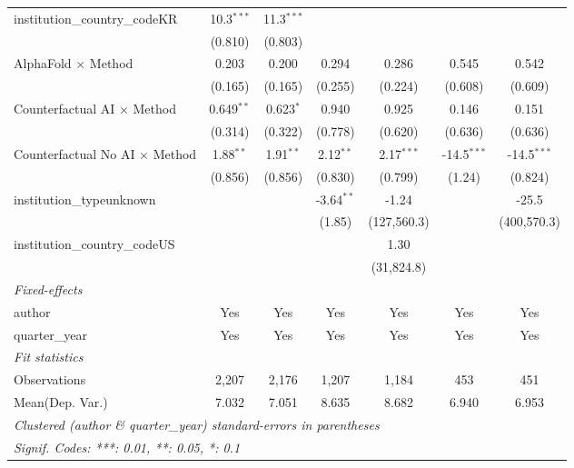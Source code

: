 \begin{tabular}{lcccccc}
   institution\_country\_codeKR          & 10.3$^{***}$   & 11.3$^{***}$   &               &               &               &   \\   
                                         & (0.810)        & (0.803)        &               &               &               &   \\   
   AlphaFold $\times$ Method             & 0.203          & 0.200          & 0.294         & 0.286         & 0.545         & 0.542\\   
                                         & (0.165)        & (0.165)        & (0.255)       & (0.224)       & (0.608)       & (0.609)\\   
   Counterfactual AI $\times$ Method     & 0.649$^{**}$   & 0.623$^{*}$    & 0.940         & 0.925         & 0.146         & 0.151\\   
                                         & (0.314)        & (0.322)        & (0.778)       & (0.620)       & (0.636)       & (0.636)\\   
   Counterfactual No AI $\times$ Method  & 1.88$^{**}$    & 1.91$^{**}$    & 2.12$^{**}$   & 2.17$^{***}$  & -14.5$^{***}$ & -14.5$^{***}$\\   
                                         & (0.856)        & (0.856)        & (0.830)       & (0.799)       & (1.24)        & (0.824)\\   
   institution\_typeunknown              &                &                & -3.64$^{**}$  & -1.24         &               & -25.5\\   
                                         &                &                & (1.85)        & (127,560.3)   &               & (400,570.3)\\   
   institution\_country\_codeUS          &                &                &               & 1.30          &               &   \\   
                                         &                &                &               & (31,824.8)    &               &   \\   
   \midrule
   \emph{Fixed-effects}\\
   author                                & Yes            & Yes            & Yes           & Yes           & Yes           & Yes\\  
   quarter\_year                         & Yes            & Yes            & Yes           & Yes           & Yes           & Yes\\  
   \midrule
   \emph{Fit statistics}\\
   Observations                          & 2,207          & 2,176          & 1,207         & 1,184         & 453           & 451\\  
Mean(Dep. Var.) & 7.032 & 7.051 & 8.635 & 8.682 & 6.940 & 6.953 \\
   \midrule \midrule
   \multicolumn{7}{l}{\emph{Clustered (author \& quarter\_year) standard-errors in parentheses}}\\
   \multicolumn{7}{l}{\emph{Signif. Codes: ***: 0.01, **: 0.05, *: 0.1}}\\
\end{tabular}
\par\endgroup
